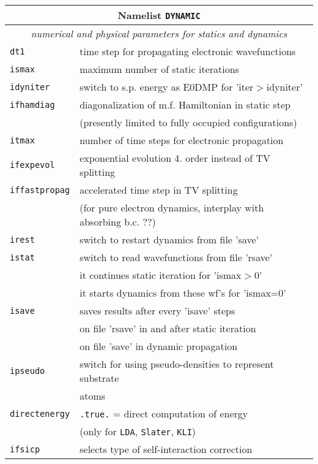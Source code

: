 \documentclass[12pt]{article}
\begin{document}
\begin{tabular}{ll}
\hline
\multicolumn{2}{c}{Namelist {\tt DYNAMIC}} in {\tt for005.<name>} \\
\hline
\multicolumn{2}{c}{\it numerical and physical parameters for statics and dynamics} \\
\hline
{\tt dt1              }& time step for propagating electronic wavefunctions\\
{\tt ismax            }& maximum number of static iterations \\
{\tt idyniter         }& switch to s.p. energy as E0DMP for 'iter$>$idyniter'\\
{\tt ifhamdiag} & diagonalization of m.f. Hamiltonian in static step\\
& (presently limited to fully occupied configurations)\\
{\tt itmax            }& number of time steps for electronic propagation\\
{\tt ifexpevol} & exponential evolution 4. order instead of TV splitting\\
{\tt iffastpropag} & accelerated time step in TV splitting\\
  & (for pure electron dynamics, interplay with absorbing b.c. ??)\\
{\tt irest            }& switch to restart dynamics from file 'save'\\
{\tt istat            }& switch to read wavefunctions from file 'rsave'\\
{\tt } &\hspace*{1em}it continues static iteration for 'ismax$>$0' \\
{\tt } &\hspace*{1em}it starts dynamics from these wf's for 'ismax=0' \\
{\tt isave            }& saves results after every 'isave' steps \\
{\tt                  }& on file 'rsave' in and after static iteration\\
{\tt                  }& on file 'save' in dynamic propagation\\
{\tt ipseudo          }& switch for using pseudo-densities to represent substrate\\
{\tt                  }& atoms \\
{\tt directenergy}   & {\tt .true.} = direct computation of energy \\
                       & (only for {\tt LDA}, {\tt Slater}, {\tt KLI})\\
{\tt ifsicp           }& selects type of self-interaction correction\\

\end{tabular}
\end{document}
